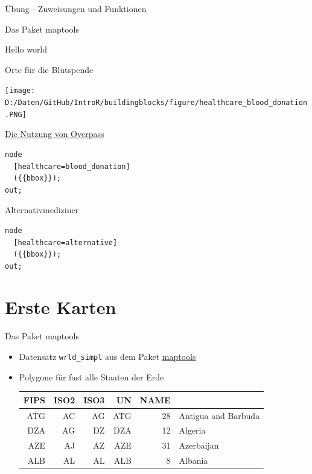 \documentclass[ignorenonframetext,]{beamer}
\begin{document}
\begin{frame}[fragile]{Übung - Zuweisungen und Funktionen}
\begin{frame}[fragile]{Das Paket maptools}
\begin{frame}[fragile]{Hello world}
\begin{frame}{Orte für die Blutspende}

\texttt{[image: D:/Daten/GitHub/IntroR/buildingblocks/figure/healthcare\_blood\_donation.PNG]}

\end{frame}

\begin{frame}[fragile]{\href{https://overpass-turbo.eu/}{Die Nutzung von
Overpass}}

\begin{verbatim}
node
  [healthcare=blood_donation]
  ({{bbox}});
out;
\end{verbatim}

\end{frame}

\begin{frame}[fragile]{Alternativmediziner}

\begin{verbatim}
node
  [healthcare=alternative]
  ({{bbox}});
out;
\end{verbatim}

\end{frame}

\section{Erste Karten}\label{erste-karten}

\begin{frame}[fragile]{Das Paket maptools}

\begin{itemize}
\item
  Datensatz \texttt{wrld\_simpl} aus dem Paket
  \href{https://cran.r-project.org/web/packages/maptools/index.html}{maptools}
\item
  Polygone für fast alle Staaten der Erde

  \begin{longtable}[]{@{}rrrrrl@{}}
  \toprule
  FIPS & ISO2 & ISO3 & UN & NAME &\tabularnewline
  \midrule
  \endhead
  ATG & AC & AG & ATG & 28 & Antigua and Barbuda\tabularnewline
  DZA & AG & DZ & DZA & 12 & Algeria\tabularnewline
  AZE & AJ & AZ & AZE & 31 & Azerbaijan\tabularnewline
  ALB & AL & AL & ALB & 8 & Albania\tabularnewline
  \bottomrule
  \end{longtable}
\end{itemize}

\end{frame}


\end{frame}
\end{frame}
\end{frame}
\end{document}

